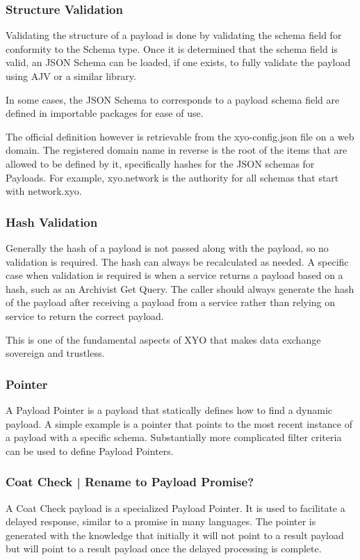 \documentclass{article}
\begin{document}
\subsubsection{Structure Validation}
Validating the structure of a payload is done by validating the schema field for conformity to the Schema type.  Once it is determined that the schema field is valid, an JSON Schema can be loaded, if one exists, to fully validate the payload using AJV or a similar library.

In some cases, the JSON Schema to corresponds to a payload schema field are defined in importable packages for ease of use.

The official definition however is retrievable from the xyo-config.json file on a web domain.  The registered domain name in reverse is the root of the items that are allowed to be defined by it, specifically hashes for the JSON schemas for Payloads.  For example, xyo.network is the authority for all schemas that start with network.xyo.

\subsubsection{Hash Validation}
Generally the hash of a payload is not passed along with the payload, so no validation is required.  The hash can always be recalculated as needed.  A specific case when validation is required is when a service returns a payload based on a hash, such as an Archivist Get Query. The caller should always generate the hash of the payload after receiving a payload from a service rather than relying on service to return the correct payload.

This is one of the fundamental aspects of XYO that makes data exchange sovereign and trustless.

\subsubsection{Pointer}
A Payload Pointer is a payload that statically defines how to find a dynamic payload.  A simple example is a pointer that points to the most recent instance of a payload with a specific schema.  Substantially more complicated filter criteria can be used to define Payload Pointers.
\subsubsection{Coat Check | Rename to Payload Promise?}
A Coat Check payload is a specialized Payload Pointer.  It is used to facilitate a delayed response, similar to a promise in many languages.  The pointer is generated with the knowledge that initially it will not point to a result payload but will point to a result payload once the delayed processing is complete.
\end{document}
